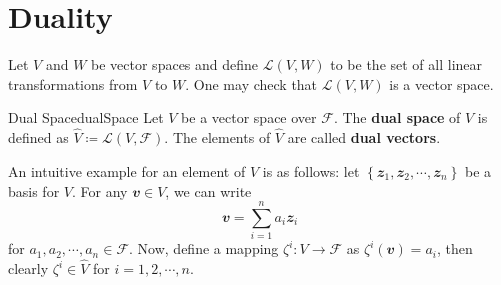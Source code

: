 \documentclass[math, code]{amznotes}
\theoremstyle{remark}
\begin{document}
\section{Duality}
Let $V$ and $W$ be vector spaces and define $\mathcal{L}(V, W)$ to be the set of all linear transformations from $V$ to $W$. One may check that $\mathcal{L}(V, W)$ is a vector space.
\begin{dfnbox}{Dual Space}{dualSpace}
    Let $V$ be a vector space over $\mathcal{F}$. The {\color{red} \textbf{dual space}} of $V$ is defined as $\hat{V} \coloneqq \mathcal{L}(V, \mathcal{F})$. The elements of $\hat{V}$ are called {\color{red} \textbf{dual vectors}}.
\end{dfnbox}
An intuitive example for an element of $\hat{V}$ is as follows: let $\left\{\mathbfit{z}_1, \mathbfit{z}_2, \cdots, \mathbfit{z}_n\right\}$ be a basis for $V$. For any $\mathbfit{v} \in V$, we can write
\begin{equation*}
    \mathbfit{v} = \sum_{i = 1}^{n}a_i\mathbfit{z}_i
\end{equation*}
for $a_1, a_2, \cdots, a_n \in \mathcal{F}$. Now, define a mapping $\zeta^i \colon V \to \mathcal{F}$ as $\zeta^i(\mathbfit{v}) = a_i$, then clearly $\zeta^i \in \hat{V}$ for $i = 1, 2, \cdots, n$.
\end{document}
